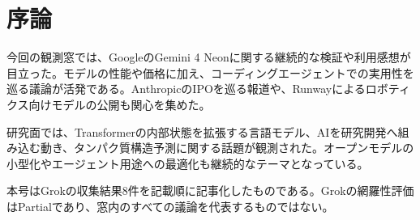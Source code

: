 \section{序論}
今回の観測窓では、GoogleのGemini 4 Neonに関する継続的な検証や利用感想が目立った。モデルの性能や価格に加え、コーディングエージェントでの実用性を巡る議論が活発である。AnthropicのIPOを巡る報道や、Runwayによるロボティクス向けモデルの公開も関心を集めた。

研究面では、Transformerの内部状態を拡張する言語モデル、AIを研究開発へ組み込む動き、タンパク質構造予測に関する話題が観測された。オープンモデルの小型化やエージェント用途への最適化も継続的なテーマとなっている。

本号はGrokの収集結果8件を記載順に記事化したものである。Grokの網羅性評価はPartialであり、窓内のすべての議論を代表するものではない。